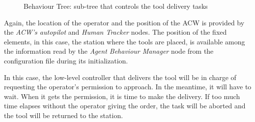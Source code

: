 \begin{figure}[ht]
\begin{center}
{}
		\caption{Behaviour Tree: sub-tree that controls the tool delivery tasks}
		\label{fig:DeliverToolTree}
	\end{center}
\end{figure}

Again, the location of the operator and the position of the \gls{ACW} is provided by the \emph{\gls{ACW}'s autopilot} and \emph{Human Tracker} nodes. The position of the fixed elements, in this case, the station where the tools are placed, is available among the information read by the \emph{Agent Behaviour Manager} node from the configuration file during its initialization.

In this case, the low-level controller that delivers the tool will be in charge of requesting the operator's permission to approach. In the meantime, it will have to wait. When it gets the permission, it is time to make the delivery. If too much time elapses without the operator giving the order, the task will be aborted and the tool will be returned to the station.

